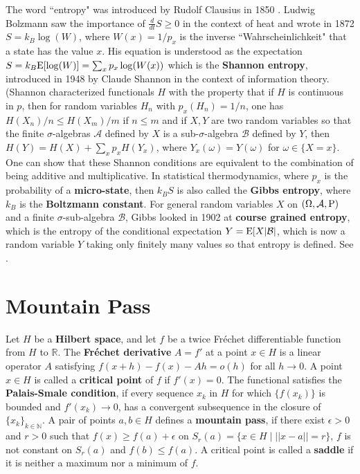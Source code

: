 \documentclass[12pt]{amsart}
\begin{document}
The word ``entropy" was introduced by Rudolf Clausius in 1850 \cite{RovelliTime}.
Ludwig Bolzmann saw the importance of $\frac{d}{dt} S \geq 0$ in the context of heat
and wrote in 1872 $S=k_B \log(W)$, where $W(x)=1/p_x$ is the inverse ``Wahrscheinlichkeit" 
that a state has the value $x$. His equation is understood as the expectation
$S=k_B {\rm E}[\log(W)] = \sum_x p_x \log(W(x))$ which is the {\bf Shannon entropy}, 
introduced in 1948 by Claude Shannon in the context of information theory.
(Shannon characterized functionals $H$ with the property
that if $H$ is continuous in $p$, then for random variables $H_n$ with $p_x(H_n)=1/n$,
one has $H(X_n)/n \leq H(X_m)/m$ if $n \leq m$ and if $X,Y$ are two
random variables so that the finite $\sigma$-algebras $\mathcal{A}$ defined by $X$
is a sub-$\sigma$-algebra $\mathcal{B}$ defined by $Y$,
then $H(Y) = H(X) + \sum_x p_x H(Y_x)$, where $Y_x(\omega)=Y(\omega)$
for $\omega \in \{ X =x \}$. One can show that these Shannon conditions are 
equivalent to the combination of being additive and multiplicative.
In statistical thermodynamics, where $p_x$ is
the probability of a {\bf micro-state}, then $k_B S$ is also called the {\bf Gibbs entropy},
where $k_B$ is the {\bf Boltzmann constant}. For general
random variables $X$ on $(\Omega,\mathcal{A},{\rm P})$ and a finite $\sigma$-sub-algebra $\mathcal{B}$, 
Gibbs looked in 1902 at {\bf course grained entropy}, which is the entropy of the conditional
expectation $Y={\rm E}[X|\mathcal{B}|$, which is now a random variable $Y$ 
taking only finitely many values so that entropy is defined. 
See \cite{Shannon48}.

\section{Mountain Pass}

Let $H$ be a {\bf Hilbert space}, and let $f$ be a twice Fr\'echet differentiable
function from $H$ to $\mathbb{R}$. The {\bf Fr\'echet derivative} $A=f'$ at a point $x \in H$
is a linear operator $A$ satisfying $f(x+h)-f(x)- A h = o(h)$ for all $h \to 0$.
A point $x \in H$ is called a {\bf critical point} of $f$ if $f'(x)=0$.
The functional satisfies the {\bf Palais-Smale condition}, if every sequence $x_k$ in $H$
for which $\{ f(x_k) \}$ is bounded and $f'(x_k) \to 0$, has a convergent subsequence in 
the closure of $\{ x_k \}_{k \in \mathbb{N}}$. 
A pair of points $a,b \in H$ defines a {\bf mountain pass}, if there exist $\epsilon>0$
and $r>0$ such that $f(x) \geq f(a)+\epsilon$ on $S_r(a) = \{ x \in H \; | \; ||x-a||=r \}$,
$f$ is not constant on $S_r(a)$ and $f(b) \leq f(a)$. 
A critical point is called a {\bf saddle} if it is neither a maximum nor a minimum of $f$.
\end{document}
